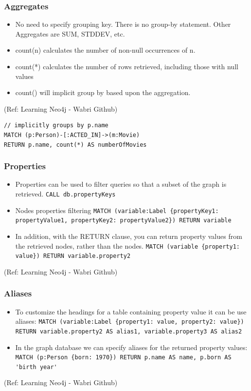 \begin{frame}[fragile]\frametitle{Aggregates}

\begin{itemize}
\item No need to specify grouping key. There is no group-by statement. Other Aggregates are SUM, STDDEV, etc.
\item count(n) calculates the number of non-null occurrences of n. 
\item count(*) calculates the number of rows retrieved, including those with null values 
\item count() will implicit group by based upon the aggregation.
\end{itemize}

{\tiny (Ref: Learning Neo4j - Wabri Github)}


\begin{lstlisting}
// implicitly groups by p.name
MATCH (p:Person)-[:ACTED_IN]->(m:Movie)
RETURN p.name, count(*) AS numberOfMovies
\end{lstlisting}	

\end{frame}

\begin{frame}\frametitle{Properties }

\begin{itemize}
\item Properties can be used to filter queries so that a subset of the graph is retrieved. \lstinline|CALL db.propertyKeys|
\item Nodes properties filtering \lstinline|MATCH (variable:Label {propertyKey1: propertyValue1, propertyKey2: propertyValue2}) RETURN variable|
\item In addition, with the RETURN clause, you can return property values from the retrieved nodes, rather than the nodes. \lstinline|MATCH (variable {property1: value}) RETURN variable.property2|
\end{itemize}


{\tiny (Ref: Learning Neo4j - Wabri Github)}
\end{frame}

\begin{frame}\frametitle{Aliases }

\begin{itemize}
\item To customize the headings for a table containing property value it can be use aliases: \lstinline|MATCH (variable:Label {property1: value, property2: value}) RETURN variable.property2 AS alias1, variable.property3 AS alias2|
\item In the graph database we can specify aliases for the returned property values: \lstinline|MATCH (p:Person {born: 1970}) RETURN p.name AS name, p.born AS 'birth year'|
\end{itemize}


{\tiny (Ref: Learning Neo4j - Wabri Github)}
\end{frame}

